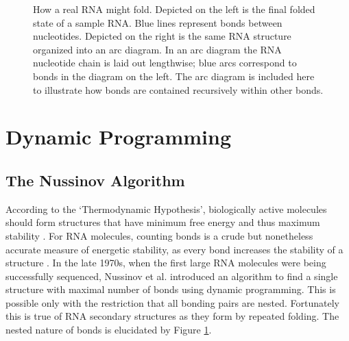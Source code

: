 \documentclass[12pt, a4paper]{article}
\begin{document}
\begin{figure}
\begin{center}
\end{center}
\caption{How a real RNA might fold. Depicted on the left is the final folded state of a sample RNA. Blue lines represent bonds between nucleotides. Depicted on the right is the same RNA structure organized into an arc diagram. In an arc diagram the RNA nucleotide chain is laid out lengthwise; blue arcs correspond to bonds in the diagram on the left. The arc diagram is included here to illustrate how bonds are contained recursively within other bonds.}
\label{fig:RNAss}
\end{figure}

\section{Dynamic Programming}
\subsection{The Nussinov Algorithm}
According to the `Thermodynamic Hypothesis', biologically active molecules should form structures that have minimum free energy and thus maximum stability \cite{anfinsen1973principles}. For RNA molecules, counting bonds is a crude but nonetheless accurate measure of energetic stability, as every bond increases the
stability of a structure \cite{nussinov1978algorithms}. In the late 1970s, when the first large RNA molecules
were being successfully sequenced, Nussinov et al. \cite{nussinov1978algorithms} introduced an algorithm to find a single structure with maximal number of bonds using dynamic programming. This is possible only with the restriction that all bonding pairs are nested. Fortunately this is true of RNA secondary structures as they form by repeated folding. The nested nature of bonds is elucidated by Figure \ref{fig:RNAss}.
\end{document}
